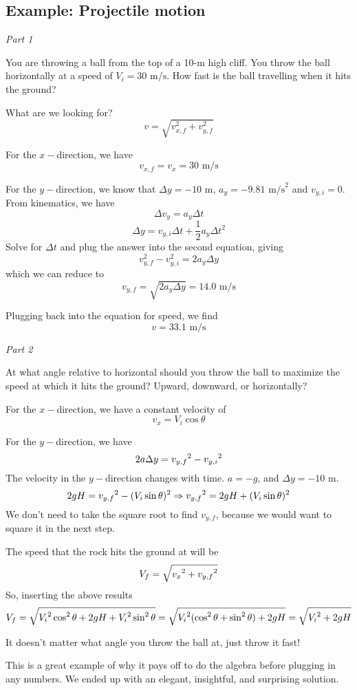 \subsection{Example: Projectile motion}
\textit{Part 1}

You are throwing a ball from the top of a 10-m high cliff. You throw the ball horizontally at a speed of $V_i=30\mbox{ m/s}$. How fast is the ball travelling when it hits the ground?

What are we looking for?
$$v = \sqrt{v_{x,f}^2+v_{y,f}^2}$$

For the $x-$direction, we have
$$v_{x,f} = v_x = 30\mbox{ m/s}$$

For the $y-$direction, we know that $\Delta y = -10\mbox{ m}$, $a_y=-9.81\mbox{ m/s}^2$ and $v_{y,i}=0$. From kinematics, we have
$$\Delta v_y = a_y\Delta t$$
$$\Delta y = v_{y,i}\Delta t + \frac{1}{2}a_y\Delta t^2$$
Solve for $\Delta t$ and plug the answer into the second equation, giving
$$v_{y,f}^2 - v_{y,i}^2 = 2a_y\Delta y$$
which we can reduce to
$$v_{y,f} = \sqrt{2a_y\Delta y} = 14.0 \mbox{ m/s}$$

Plugging back into the equation for speed, we find
$$v = 33.1 \mbox{ m/s}$$
\bigskip


\textit{Part 2}

At what angle relative to horizontal should you throw the ball to maximize the speed at which it hits the ground? Upward, downward, or horizontally?

For the $x-$direction, we have a constant velocity of
$$v_x=V_i\cos\theta$$

For the $y-$direction, we have
$$2a\Delta{y}=v_{y,f}\displaystyle^2-v_{y,i}\displaystyle^2$$
The velocity in the $y-$direction changes with time. $a=-g$, and $\Delta{y}=-10\mbox{ m}$.
$$2gH=v_{y,f}\displaystyle^2-(V_i\sin\theta)\displaystyle^2\Rightarrow v_{y,f}\displaystyle^2=2gH+(V_i\sin\theta)\displaystyle^2$$
We don't need to take the square root to find $v_{y,f}$, because we would want to square it in the next step.

The speed that the rock hits the ground at will be
$$V_f=\sqrt{v_x\displaystyle^2+v_{y,f}\displaystyle^2}$$
So, inserting the above results
$$V_f=\sqrt{V_i\displaystyle^2\cos^2\theta+2gH+V_i\displaystyle^2\sin^2\theta}=\sqrt{V_i\displaystyle^2(\cos^2\theta+\sin^2\theta)+2gH} = \sqrt{V_i\displaystyle^2+2gH}$$

It doesn't matter what angle you throw the ball at, just throw it fast!

This is a great example of why it pays off to do the algebra before plugging in any numbers. We ended up with an elegant, insightful, and surprising solution.

